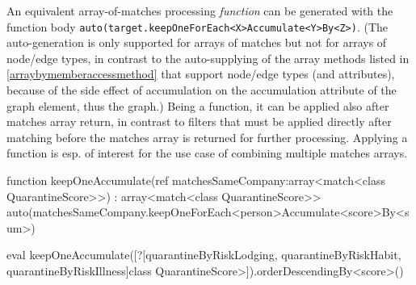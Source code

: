 An equivalent array-of-matches processing \emph{function} can be generated with the function body \texttt{auto(target.keepOneForEach<X>Accumulate<Y>By<Z>)}.
(The auto-generation is only supported for arrays of matches but not for arrays of node/edge types, in contrast to the auto-supplying of the array methods listed in \ref{arraybymemberaccessmethod} that support node/edge types (and attributes), because of the side effect of accumulation on the accumulation attribute of the graph element, thus the graph.)
Being a function, it can be applied also after matches array return, in contrast to filters that must be applied directly after matching before the matches array is returned for further processing.
Applying a function is esp. of interest for the use case of combining multiple matches arrays.

\begin{example}
  \begin{grgen}
function keepOneAccumulate(ref matchesSameCompany:array<match<class QuarantineScore>>) : array<match<class QuarantineScore>>
{
	auto(matchesSameCompany.keepOneForEach<person>Accumulate<score>By<sum>)
}
  \end{grgen}\label{exkeeponeforeachaccumulateby}

	\begin{grshell}
	eval keepOneAccumulate([?[quarantineByRiskLodging, quarantineByRiskHabit, quarantineByRiskIllness]\<class QuarantineScore>]).orderDescendingBy<score>()
	\end{grshell}
\end{example}
